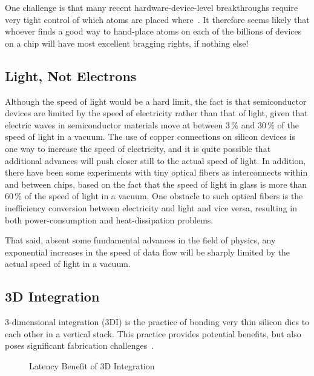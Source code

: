 One challenge is that many recent hardware-device-level breakthroughs
require very tight control of which atoms are placed
where~\cite{MichaelJKelly2017DeviceLevel}.
It therefore seems likely that whoever finds a good way to hand-place
atoms on each of the billions of devices on a chip will have most
excellent bragging rights, if nothing else!

\subsection{Light, Not Electrons}
\label{sec:cpu:Light; Not Electrons}

Although the speed of light would be a hard limit, the fact is that
semiconductor devices are limited by the speed of electricity rather
than that of light, given that electric waves in semiconductor materials
move at between 3\,\% and 30\,\% of the speed of light in a vacuum.
The use of copper connections on silicon devices is one way to increase
the speed of electricity, and it is quite possible that additional
advances will push closer still to the actual speed of light.
In addition, there have been some experiments with tiny optical fibers
as interconnects within and between chips, based on the fact that
the speed of light in glass is more than 60\,\% of the speed of light
in a vacuum.
One obstacle to such optical fibers is the inefficiency conversion
between electricity and light and vice versa, resulting in both
power-consumption and heat-dissipation problems.

That said, absent some fundamental advances in the field of physics,
any exponential increases in the speed of data flow
will be sharply limited by the actual speed of light in a vacuum.

\subsection{3D Integration}
\label{sec:cpu:3D Integration}

3-dimensional integration (3DI) is the practice of bonding
very thin silicon dies to each other in a vertical stack.
This practice provides potential benefits, but also poses
significant fabrication challenges~\cite{JohnKnickerbocker2008:3DI}.

\begin{figure}
\centering
{}
\caption{Latency Benefit of 3D Integration}
\label{fig:cpu:Latency Benefit of 3D Integration}
\end{figure}

